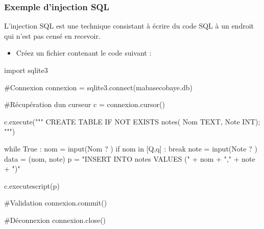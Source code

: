 \documentclass[
  a4paper,
  DIV=11,
  numbers=noendperiod]{scrartcl}
\newenvironment{Shaded}{\begin{snugshade}}{\end{snugshade}}
\newcommand{\BuiltInTok}[1]{\textcolor[rgb]{0.00,0.23,0.31}{#1}}
\newcommand{\CommentTok}[1]{\textcolor[rgb]{0.37,0.37,0.37}{#1}}
\newcommand{\ControlFlowTok}[1]{\textcolor[rgb]{0.00,0.23,0.31}{#1}}
\newcommand{\ExtensionTok}[1]{\textcolor[rgb]{0.00,0.23,0.31}{#1}}
\newcommand{\ImportTok}[1]{\textcolor[rgb]{0.00,0.46,0.62}{#1}}
\newcommand{\KeywordTok}[1]{\textcolor[rgb]{0.00,0.23,0.31}{#1}}
\newcommand{\NormalTok}[1]{\textcolor[rgb]{0.00,0.23,0.31}{#1}}
\newcommand{\OperatorTok}[1]{\textcolor[rgb]{0.37,0.37,0.37}{#1}}
\newcommand{\StringTok}[1]{\textcolor[rgb]{0.13,0.47,0.30}{#1}}
\newcommand{\VariableTok}[1]{\textcolor[rgb]{0.07,0.07,0.07}{#1}}
\providecommand{\tightlist}{%
  \setlength{\itemsep}{0pt}\setlength{\parskip}{0pt}}\usepackage{longtable,booktabs,array}
\begin{document}
\hypertarget{exemple-dinjection-sql}{%
\subsubsection{Exemple d'injection SQL}\label{exemple-dinjection-sql}}

L'injection SQL est une technique consistant à écrire du code SQL à un
endroit qui n'est pas censé en recevoir.

\begin{itemize}
\tightlist
\item
  Créez un fichier contenant le code suivant :
\end{itemize}

\begin{Shaded}
\begin{Highlighting}[]
\ImportTok{import}\NormalTok{ sqlite3}

\CommentTok{\#Connexion}
\NormalTok{connexion }\OperatorTok{=}\NormalTok{ sqlite3.}\ExtensionTok{connect}\NormalTok{(}\StringTok{\textquotesingle{}mabasecobaye.db\textquotesingle{}}\NormalTok{)}

\CommentTok{\#Récupération d\textquotesingle{}un curseur}
\NormalTok{c }\OperatorTok{=}\NormalTok{ connexion.cursor()}

\NormalTok{c.execute(}\StringTok{"""}
\StringTok{    CREATE TABLE IF NOT EXISTS notes(}
\StringTok{    Nom TEXT,}
\StringTok{    Note INT);}
\StringTok{    """}\NormalTok{)}

\ControlFlowTok{while} \VariableTok{True}\NormalTok{ :}
\NormalTok{    nom }\OperatorTok{=} \BuiltInTok{input}\NormalTok{(}\StringTok{\textquotesingle{}Nom ? \textquotesingle{}}\NormalTok{)}
    \ControlFlowTok{if}\NormalTok{ nom }\KeywordTok{in}\NormalTok{ [}\StringTok{\textquotesingle{}Q\textquotesingle{}}\NormalTok{,}\StringTok{\textquotesingle{}q\textquotesingle{}}\NormalTok{] :}
        \ControlFlowTok{break}
\NormalTok{    note }\OperatorTok{=} \BuiltInTok{input}\NormalTok{(}\StringTok{\textquotesingle{}Note ? \textquotesingle{}}\NormalTok{)}
\NormalTok{    data }\OperatorTok{=}\NormalTok{ (nom, note)}
\NormalTok{    p }\OperatorTok{=} \StringTok{"INSERT INTO notes VALUES (\textquotesingle{}"} \OperatorTok{+}\NormalTok{ nom }\OperatorTok{+} \StringTok{"\textquotesingle{},\textquotesingle{}"} \OperatorTok{+}\NormalTok{ note }\OperatorTok{+} \StringTok{"\textquotesingle{})"}

\NormalTok{    c.executescript(p)}

\CommentTok{\#Validation}
\NormalTok{connexion.commit()}

\CommentTok{\#Déconnexion}
\NormalTok{connexion.close()}
\end{Highlighting}
\end{Shaded}
\end{document}
